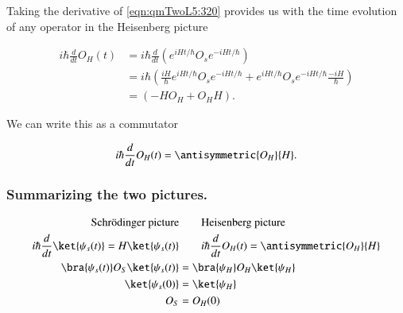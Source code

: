 Taking the derivative of \ref{eqn:qmTwoL5:320} provides us with the time evolution of any operator in the Heisenberg picture

\begin{align*}
i \hbar \frac{d}{dt} O_H(t) 
&=
i \hbar \frac{d}{dt} \left( 
e^{i H t/\hbar} O_s e^{-i H t/\hbar}
\right) \\
&=
i \hbar \left( 
\frac{i H}{\hbar} e^{i H t/\hbar} O_s e^{-i H t/\hbar}
+
e^{i H t/\hbar} O_s e^{-i H t/\hbar} \frac{-i H}{\hbar} 
\right) \\
&=
\left( 
-H O_H
+
O_H H
\right).
\end{align*}

We can write this as a commutator

\begin{equation}\label{eqn:qmTwoL5:380}
i \hbar \frac{d}{dt} O_H(t) = \antisymmetric{O_H}{H}.
\end{equation}

\subsubsection{Summarizing the two pictures.}

\begin{align*}
\text{Schr\"{o}dinger picture} &\qquad \text{Heisenberg picture} \\
i \hbar \frac{d}{dt} \ket{\psi_s(t)} = H \ket{\psi_s(t)} &\qquad i \hbar \frac{d}{dt} O_H(t) = \antisymmetric{O_H}{H} \\
\bra{\psi_s(t)} O_S \ket{\psi_s(t)} &= \bra{\psi_H} O_H \ket{\psi_H} \\
\ket{\psi_s(0)} &= \ket{\psi_H} \\
O_S &= O_H(0)
\end{align*}

\EndArticle
